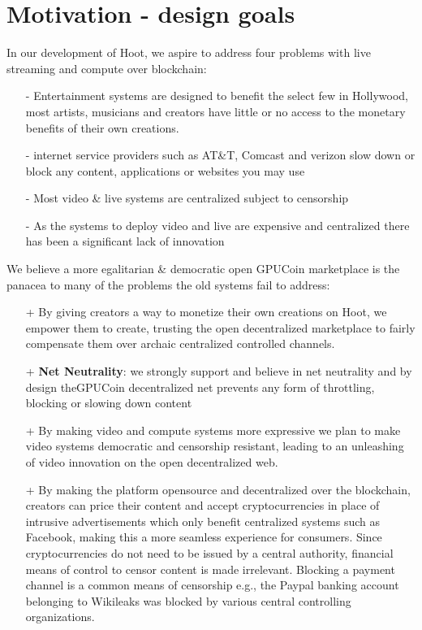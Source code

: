 \documentclass{article}
\begin{document}
\section{Motivation - design goals}
In our development of Hoot, we aspire to address four problems with live streaming and compute over blockchain:
\begin{itemize}
\item[-]Entertainment systems are designed to benefit the select few in Hollywood, most artists, musicians and creators have little or no access to the monetary benefits of their own creations.
\item[-]internet service providers such as AT\&T, Comcast and verizon slow down or block any content, applications or websites you may use
\item[-]Most video \& live systems are centralized subject to censorship

\item[-]As the systems to deploy video and live are expensive and centralized there has been a significant lack of innovation

\end{itemize}


We believe a more egalitarian \& democratic open GPUCoin marketplace is the panacea to many of the problems the old systems fail to address:
\begin{itemize}
\item[+]By giving creators a way to monetize their own creations on Hoot, we empower them to create, trusting the open decentralized marketplace to fairly compensate them over archaic centralized controlled channels.
\item[+]\textbf{Net Neutrality}: we strongly support and believe in net neutrality and by design theGPUCoin decentralized net prevents any form of throttling, blocking or slowing down content

\item[+]By making video and compute systems more expressive we plan to make video systems democratic and censorship resistant, leading to an unleashing of video innovation on the open decentralized web.

\item[+]By making the platform opensource and decentralized over the blockchain, creators can price their content and accept cryptocurrencies in place of intrusive advertisements which only benefit centralized systems such as Facebook, making this a more seamless experience for consumers. Since cryptocurrencies do not need to be issued by a central authority, financial means of control to censor content is made irrelevant. Blocking a payment channel is a common means of censorship e.g., the Paypal banking account belonging to Wikileaks was blocked by various central controlling organizations.
\end{itemize}
\end{document}
